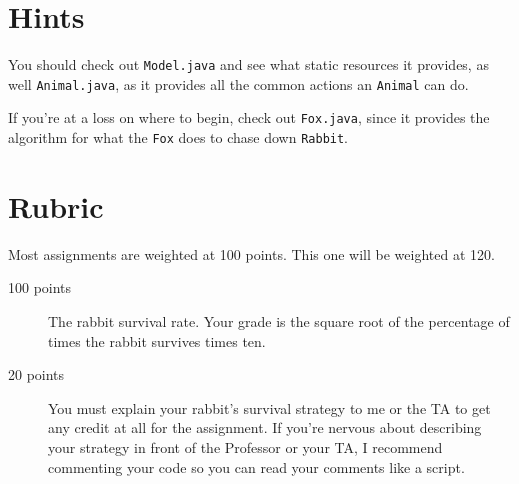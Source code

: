 \documentclass[10pt,letterpaper]{article}
\begin{document}
	\section{Hints}
	You should check out \texttt{Model.java} and  see what static resources it provides, as well \texttt{Animal.java}, as it provides all the common actions an \texttt{Animal} can do.
	
	If you're at a loss on where to begin, check out \texttt{Fox.java}, since it provides the algorithm for what the \texttt{Fox} does to chase down \texttt{Rabbit}.
	
	
	
	
	\section{Rubric}
	Most assignments are weighted at 100 points.
	This one will be weighted at 120.
	\begin{description}
		\item[100 points] The rabbit survival rate.  Your grade is the square root of the percentage of times the rabbit survives times ten.
		\item[20 points] You must explain your rabbit's survival strategy to me or the TA to get any credit at all for the assignment. 
		If you're nervous about describing your strategy in front of the Professor or your TA, I recommend commenting your code so you can read your comments like a script.
	\end{description}
	
	 
\end{document}
